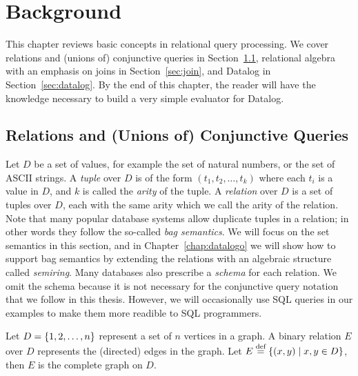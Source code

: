 \chapter{Background}
\label{chap:background}

This chapter reviews basic concepts in relational query processing. 
We cover relations and (unions of) conjunctive queries in Section~\ref{sec:relations-and-conjunctive-queries},
 relational algebra with an emphasis on joins in Section~\ref{sec:join},
 and Datalog in Section~\ref{sec:datalog}.
By the end of this chapter, 
 the reader will have the knowledge necessary
 to build a very simple evaluator for Datalog.

\section{Relations and (Unions of) Conjunctive Queries}
\label{sec:relations-and-conjunctive-queries}

Let $D$ be a set of values, for example the set of natural numbers,
 or the set of ASCII strings.
A {\em tuple} over $D$ is of the form $(t_1, t_2, \ldots, t_k)$
 where each $t_i$ is a value in $D$,
 and $k$ is called the {\em arity} of the tuple.
A {\em relation} over $D$ is a set of tuples over $D$,
 each with the same arity which we call the arity of the relation.
Note that many popular database systems allow duplicate tuples in a relation;
 in other words they follow the so-called {\em bag semantics}.
We will focus on the set semantics in this section,
 and in Chapter~\ref{chap:datalogo} we will show how to
 support bag semantics by extending the relations
 with an algebraic structure called {\em semiring}.
Many databases also prescribe a {\em schema} for each relation.
We omit the schema because it is not necessary for the 
 conjunctive query notation that we follow in this thesis.
However, we will occasionally use SQL queries in our examples 
 to make them more readible to SQL programmers.

\begin{ex}
\label{ex:relation}
Let $D = \{1, 2, \ldots, n\}$ represent a set of $n$ vertices in a graph.
A binary relation $E$ over $D$ represents the (directed) edges in the graph.
Let $E \stackrel{\text{def}}{=} \{{(x, y)}\mid{x, y \in D}\}$, then $E$ is the complete graph on $D$.
\end{ex}

